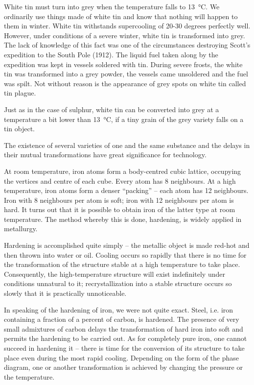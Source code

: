 White tin must turn into grey when the temperature falls to \SI{+13}{\celsius}. We ordinarily use things made of white tin and know that nothing will happen to them in winter. White tin withstands supercooling of 20-30 degrees per­fectly well. However, under conditions of a severe winter, white tin is transformed into grey. The lack of knowledge of this fact was one of the circumstances destroying Scott’s expedition to the South Pole (1912). The liquid fuel taken along by the expedition was kept in vessels soldered with tin. During severe frosts, the white tin was transformed into a grey powder, the vessels came unsoldered and the fuel was spilt. Not without reason is the appear­ance of grey spots on white tin called tin plague.

Just as in the case of sulphur, white tin can be converted into grey at a temperature a bit lower than \SI{13}{\celsius}, if a tiny grain of the grey variety falls on a tin object.

The existence of several varieties of one and the same substance and the delays in their mutual transformations have great significance for technology.

At room temperature, iron atoms form a body-centred cubic lattice, occupying the vertices and centre of each cube. Every atom has 8 neighbours. At a high tempera­ture, iron atoms form a denser ``packing'' -- each atom has 12 neighbours. Iron with 8 neighbours per atom is soft; iron with 12 neighbours per atom is hard. It turns out that it is possible to obtain iron of the latter type at room temperature. The method whereby this is done, hardening, is widely applied in metallurgy.

Hardening is accomplished quite simply -- the metallic object is made red-hot and then thrown into water or oil. Cooling occurs so rapidly that there is no time for the transformation of the structure stable at a high temper­ature to take place. Consequently, the high-temperature structure will exist indefinitely under conditions unnat­ural to it; recrystallization into a stable structure occurs so slowly that it is practically unnoticeable.

In speaking of the hardening of iron, we were not quite exact. Steel, i.e. iron containing a fraction of a percent of carbon, is hardened. The presence of very small admix­tures of carbon delays the transformation of hard iron into soft and permits the hardening to be carried out. As for completely pure iron, one cannot succeed in hardening it -- there is time for the conversion of its structure to take place even during the most rapid cooling.
Depending on the form of the phase diagram, one or another transformation is achieved by changing the pres­sure or the temperature.

